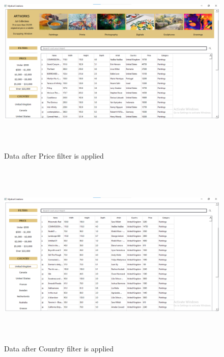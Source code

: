 \documentclass[12pt]{article}
\begin{document}
    \newpage
    \begin{figure}[ht!]
	    \includegraphics[width = 16cm, height = 9cm]{Price Filter.png}
	    \renewcommand{\thefigure}{3.11}
	    \caption{Data after Price filter is applied}
    \end{figure}
    \begin{figure}[ht!]
	    \includegraphics[width = 16cm, height = 9cm]{Country Filter.png}
	    \renewcommand{\thefigure}{3.12}
	    \caption{Data after Country filter is applied}
    \end{figure}
    
\end{document}
